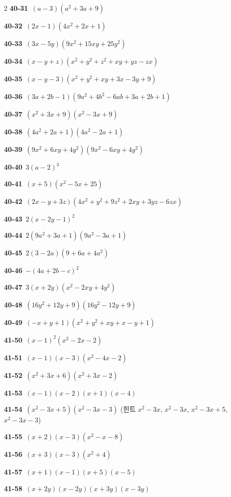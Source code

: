 \documentclass[10pt,a4paper]{article}
\begin{document}
\begin{multicols}{2}
\noindent\textbf{40-31}\ $(a-3)(a^2+3a+9)$\par
\noindent\textbf{40-32}\ $(2x-1)(4x^2+2x+1)$\par
\noindent\textbf{40-33}\ $(3x-5y)(9x^2+15xy+25y^2)$\par
\noindent\textbf{40-34}\ $(x-y+z)(x^2+y^2+z^2+xy+yz-zx)$\par
\noindent\textbf{40-35}\ $(x-y-3)(x^2+y^2+xy+3x-3y+9)$\par
\noindent\textbf{40-36}\ $(3a+2b-1)(9a^2+4b^2-6ab+3a+2b+1)$\par
\noindent\textbf{40-37}\ $(x^2+3x+9)(x^2-3x+9)$\par
\noindent\textbf{40-38}\ $(4a^2+2a+1)(4a^2-2a+1)$\par
\noindent\textbf{40-39}\ $(9x^2+6xy+4y^2)(9x^2-6xy+4y^2)$\par
\noindent\textbf{40-40}\ $3(a-2)^3$\par
\noindent\textbf{40-41}\ $(x+5)(x^2-5x+25)$\par
\noindent\textbf{40-42}\ $(2x-y+3z)(4x^2+y^2+9z^2+2xy+3yz-6zx)$\par
\noindent\textbf{40-43}\ $2(x-2y-1)^2$\par
\noindent\textbf{40-44}\ $2(9a^2+3a+1)(9a^2-3a+1)$\par
\noindent\textbf{40-45}\ $2(3-2a)(9+6a+4a^2)$\par
\noindent\textbf{40-46}\ $-(4a+2b-c)^2$\par
\noindent\textbf{40-47}\ $3(x+2y)(x^2-2xy+4y^2)$\par
\noindent\textbf{40-48}\ $(16y^2+12y+9)(16y^2-12y+9)$\par
\noindent\textbf{40-49}\ $(-x+y+1)(x^2+y^2+xy+x-y+1)$\par
\noindent\textbf{41-50}\ $(x-1)^2(x^2-2x-2)$\par
\noindent\textbf{41-51}\ $(x-1)(x-3)(x^2-4x-2)$\par
\noindent\textbf{41-52}\ $(x^2+3x+6)(x^2+3x-2)$\par
\noindent\textbf{41-53}\ $(x-1)(x-2)(x+1)(x-4)$\par
\noindent\textbf{41-54}\ $(x^2-3x+5)(x^2-3x-3)$ (힌트 $x^2-3x$, $x^2-3x$, $x^2-3x+5$, $x^2-3x-3$)\par
\noindent\textbf{41-55}\ $(x+2)(x-3)(x^2-x-8)$\par
\noindent\textbf{41-56}\ $(x+3)(x-3)(x^2+4)$\par
\noindent\textbf{41-57}\ $(x+1)(x-1)(x+5)(x-5)$\par
\noindent\textbf{41-58}\ $(x+2y)(x-2y)(x+3y)(x-3y)$\par

\end{multicols}
\end{document}
